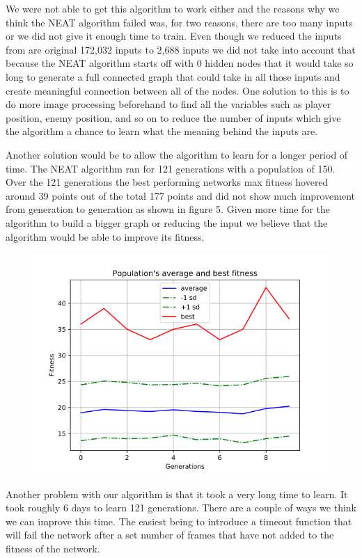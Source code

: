\documentclass[12pt,journal,compsoc]{IEEEtran}
\begin{document}
We were not able to get this algorithm to work either and the reasons why we think the NEAT algorithm failed was, for two reasons, there are too many inputs or we did not give it enough time to train. Even though we reduced the inputs from are original 172,032 inputs to 2,688 inputs we did not take into account that because the NEAT algorithm starts off with 0 hidden nodes that it would take so long to generate a full connected graph that could take in all those inputs and create meaningful connection between all of the nodes. One solution to this is to do more image processing beforehand to find all the variables such as player position, enemy position, and so on to reduce the number of inputs which give the algorithm a chance to learn what the meaning behind the inputs are. 

Another solution would be to allow the algorithm to learn for a longer period of time. The NEAT algorithm ran for 121 generations with a population of 150. Over the 121 generations the best performing networks max fitness hovered around 39 points out of the total 177 points and did not show much improvement from generation to generation as shown in figure 5. Given more time for the algorithm to build a bigger graph or reducing the input we believe that the algorithm would be able to improve its fitness.

\begin{figure}
\centering
  \includegraphics[width=1\linewidth]{avg_fitness.png}
\end{figure}

Another problem with our algorithm is that it took a very long time to learn. It took roughly 6 days to learn 121 generations. There are a couple of ways we think we can improve this time. The easiest being to introduce a timeout function that will fail the network after a set number of frames that have not added to the fitness of the network.
\end{document}
